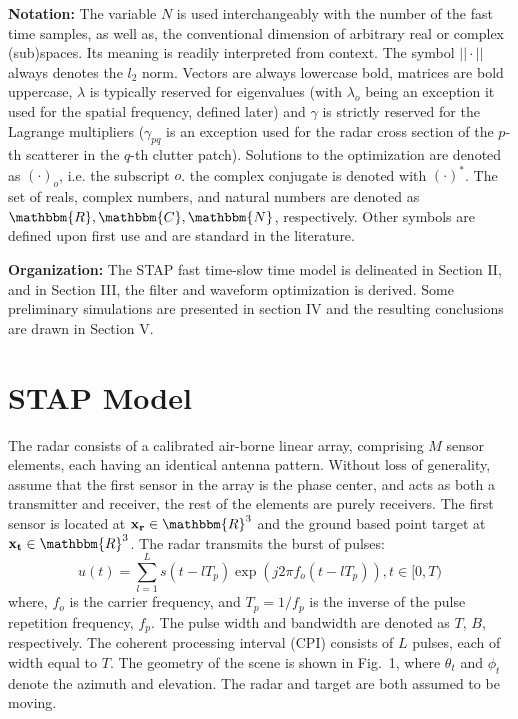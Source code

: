\documentclass[11pt,draftclsnofoot,onecolumn]{IEEEtran}
\theoremstyle{definition}
\theoremstyle{remark}
\begin{document}
{\bf Notation:} The variable $N$ is used interchangeably with the number of the fast time samples, as well as, the conventional dimension of arbitrary real or complex (sub)spaces. Its meaning is readily interpreted from context. The  symbol $|| \cdot||$ always denotes the $l_2$ norm. Vectors are always lowercase bold, matrices are bold uppercase, $\lambda$ is typically reserved for eigenvalues (with $\lambda_o$ being an exception it used for the spatial frequency, defined later) and $\gamma$ is strictly reserved for the Lagrange multipliers ($\gamma_{pq}$ is an exception used for the radar cross section of the $p$-th scatterer in the $q$-th clutter patch). Solutions to the optimization are denoted as $(\cdot)_o$, i.e. the subscript $o$. the complex conjugate is denoted with $(\cdot)^{\ast}$. The set of reals, complex numbers, and natural numbers are denoted as $\mathbbm{R},\mathbbm{C},\mathbbm{N}$, respectively. Other symbols are defined upon first use and are standard in the literature. 

{\bf Organization:} The STAP fast time-slow time model is delineated in Section II, and in Section III, the filter and waveform optimization is derived. Some preliminary simulations are presented in section IV and  the resulting conclusions are drawn in Section V.




\section{STAP Model}
The radar consists of a calibrated  air-borne linear array, comprising $M$ sensor elements, each having an identical antenna pattern. Without loss of generality, assume that the first sensor in the array is the phase center, and acts as both a transmitter and receiver, the rest of the elements are purely receivers. The first sensor is located at $\mathbf{x_r}\in\mathbbm{R}^3$ and the ground based point target at  $\mathbf{x_t}\in\mathbbm{R}^3$. The radar transmits the burst of pulses: \begin{equation} \label{eq1}
 u(t)=\sum\limits_{l=1}^{L}s(t-lT_p)\exp(j2\pi f_o(t-lT_p)),t\in[0,T)
 \end{equation}
where, $f_o$ is the carrier frequency, and $T_p=1/f_p$ is the inverse of the pulse repetition frequency, $f_p$. The pulse width and bandwidth are denoted as $T$, $B$, respectively. The coherent processing interval (CPI) consists of $L$ pulses, each of width equal to $T$. The geometry of the scene is shown in Fig.~1, where $\theta_t$ and $\phi_t$ denote the azimuth and elevation. The radar and target are both assumed to be moving. 
\end{document}
